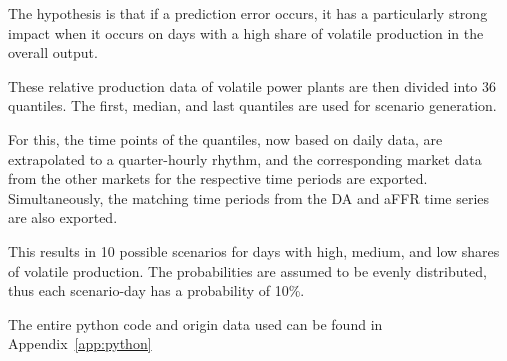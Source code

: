 The hypothesis is that if a prediction error occurs, it has a particularly strong impact when it occurs on days
with a high share of volatile production in the overall output.

These relative production data of volatile power plants are then divided into 36 quantiles.
The first, median, and last quantiles are used for scenario generation.

For this, the time points of the quantiles, now based on daily data, are extrapolated to a quarter-hourly rhythm,
and the corresponding market data from the other markets for the respective time periods are exported.
Simultaneously, the matching time periods from the DA and aFFR time series are also exported.

This results in 10 possible scenarios for days with high, medium, and low shares of volatile production.
The probabilities are assumed to be evenly distributed, thus each scenario-day has a probability of 10\%.


The entire python code and origin data used can be found in Appendix~\ref{app:python}

